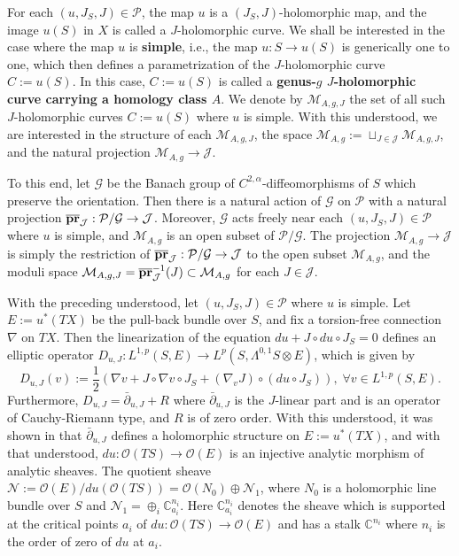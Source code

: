 \documentclass[11pt]{amsart}
\theoremstyle{plain}
\numberwithin{theorem}{section}
\theoremstyle{definition}
\newcommand{\C}{{\mathbb C}}
\newcommand{\J}{{\mathcal J}}
\newcommand{\M}{{\mathcal M}}
\renewcommand{\O}{{\mathcal O}}
\newcommand{\N}{{\mathcal N}}
\newcommand{\G}{{\mathcal G}}
\newcommand{\p}{{\mathcal P}}
\begin{document}
For each $(u,J_S,J)\in \p$, the map $u$ is a $(J_S,J)$-holomorphic map, and the image $u(S)$ in
$X$ is called a $J$-holomorphic curve. We shall be interested in the case where the map $u$ is
{\bf simple}, i.e., the map $u: S\rightarrow u(S)$ is generically one to one, which then defines a
parametrization of the $J$-holomorphic curve $C:=u(S)$. In this case, $C:=u(S)$ is called a
{\bf genus-$g$ $J$-holomorphic curve carrying a homology class $A$}. We denote by $\M_{A,g,J}$ the set of all such $J$-holomorphic curves $C:=u(S)$ where $u$ is simple. With this understood, we are interested in 
the structure of each $\M_{A,g,J}$, the space $\M_{A,g}:=\sqcup_{J\in\J} \M_{A,g,J}$, and the natural projection 
$\M_{A,g}\rightarrow \J$. 

To this end, let $\G$ be the Banach group of $C^{2,\alpha}$-diffeomorphisms of $S$ which preserve the orientation. Then there is a natural action of $\G$ on $\p$ with a natural projection $\overline{{\bf pr}}_\J:\p/\G\rightarrow \J$.
Moreover, $\G$ acts freely near each $(u,J_S,J)\in \p$ where $u$ is simple, and 
$\M_{A,g}$ is an open subset of $\p/\G$. The projection $\M_{A,g}\rightarrow \J$ is simply the restriction of $\overline{{\bf pr}}_\J:\p/\G\rightarrow \J$ to the open subset $\M_{A,g}$, and the moduli space 
$\M_{A,g,J}=\overline{{\bf pr}}_\J^{-1}(J)\subset \M_{A,g}$ for each $J\in\J$.

With the preceding understood, let $(u,J_S,J)\in\p$ where $u$ is simple. Let $E:=u^\ast(TX)$ be the pull-back bundle over $S$, and fix a torsion-free connection $\nabla$ on $TX$. Then the linearization of the equation $du+J\circ du\circ J_S=0$ defines an elliptic operator 
$D_{u,J}: L^{1,p}(S,E)\rightarrow L^p(S, \Lambda^{0,1}S \otimes E)$, which is given by
$$
D_{u,J}(v):=\frac{1}{2}(\nabla v+J\circ\nabla v\circ J_S+ (\nabla_v J)\circ (du\circ J_S)), \; \forall 
v\in L^{1,p}(S,E).
$$
Furthermore, $D_{u,J}=\bar{\partial}_{u,J}+R$ where $\bar{\partial}_{u,J}$ is the $J$-linear part and is
an operator of Cauchy-Riemann type, and $R$ is of zero order. With this understood, it was shown
in \cite{IvaS} that $\bar{\partial}_{u,J}$ defines a holomorphic structure on $E:=u^\ast(TX)$, and with
that understood, $du: \O(TS)\rightarrow \O(E)$ is an injective analytic morphism of analytic sheaves. The quotient
sheave $\N:=\O(E)/du(\O(TS))=\O(N_0)\oplus \N_1$, where $N_0$ is a holomorphic line bundle over
$S$ and $\N_1=\oplus_i \C^{n_i}_{a_i}$. Here $\C^{n_i}_{a_i}$ denotes the sheave which is supported 
at the critical points $a_i$ of $du: \O(TS)\rightarrow \O(E)$ and has a stalk $\C^{n_i}$ where $n_i$
is the order of zero of $du$ at $a_i$. 
\end{document}
